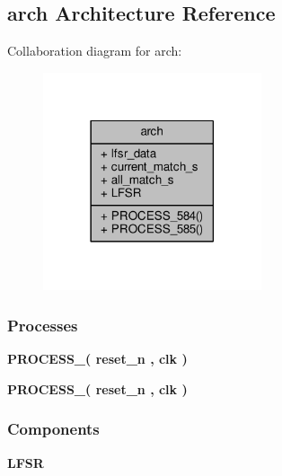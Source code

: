 \subsection{arch Architecture Reference}
\label{classddr2__data__check_1_1arch}


Collaboration diagram for arch\+:\nopagebreak
\begin{figure}[H]
\begin{center}
\leavevmode
\includegraphics[width=182pt]{da/d8c/classddr2__data__check_1_1arch__coll__graph}
\end{center}
\end{figure}
\subsubsection*{Processes}
 \begin{DoxyCompactItemize}
\item 
{\bf P\+R\+O\+C\+E\+S\+S\+\_}{\bfseries  ( {\bfseries {\bfseries {\bf reset\+\_\+n}} \textcolor{vhdlchar}{ }} , {\bfseries {\bfseries {\bf clk}} \textcolor{vhdlchar}{ }} )}
\item 
{\bf P\+R\+O\+C\+E\+S\+S\+\_}{\bfseries  ( {\bfseries {\bfseries {\bf reset\+\_\+n}} \textcolor{vhdlchar}{ }} , {\bfseries {\bfseries {\bf clk}} \textcolor{vhdlchar}{ }} )}
\end{DoxyCompactItemize}
\subsubsection*{Components}
 \begin{DoxyCompactItemize}
\item 
{\bf L\+F\+SR}  {\bfseries }  
\end{DoxyCompactItemize}
